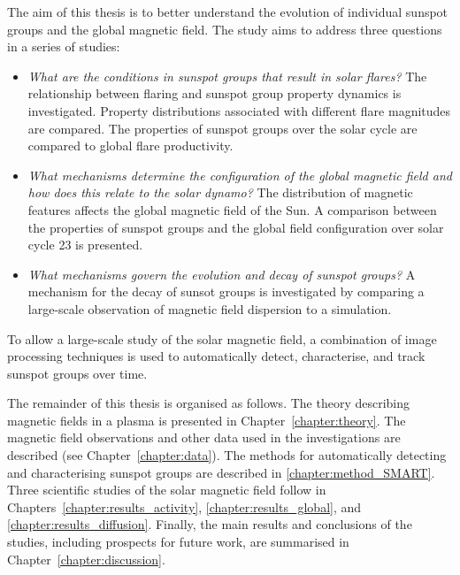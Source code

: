 The aim of this thesis is to better understand the evolution of individual sunspot groups and the global magnetic field. The study aims to address three questions in a series of studies:
\begin{itemize}
\item \emph{What are the conditions in sunspot groups that result in solar flares?} The relationship between flaring and sunspot group property dynamics is investigated. Property distributions associated with different flare magnitudes are compared. The properties of sunspot groups over the solar cycle are compared to global flare productivity. 
\item \emph{What mechanisms determine the configuration of the global magnetic field and how does this relate to the solar dynamo?} The distribution of magnetic features affects the global magnetic field of the Sun. A comparison between the properties of sunspot groups and the global field configuration over solar cycle 23 is presented. 
\item \emph{What mechanisms govern the evolution and decay of sunspot groups?} A mechanism for the decay of sunsot groups is investigated by comparing a large-scale observation of magnetic field dispersion to a simulation. 
\end{itemize}
To allow a large-scale study of the solar magnetic field, a combination of image processing techniques is used to automatically detect, characterise, and track sunspot groups over time.

The remainder of this thesis is organised as follows.
The theory describing magnetic fields in a plasma is presented in Chapter~\ref{chapter:theory}. 
The magnetic field observations and other data used in the investigations are described (see Chapter~\ref{chapter:data}). 
The methods for automatically detecting and characterising sunspot groups are described in \ref{chapter:method_SMART}. 
Three scientific studies of the solar magnetic field follow in Chapters~\ref{chapter:results_activity}, \ref{chapter:results_global}, and \ref{chapter:results_diffusion}.
Finally, the main results and conclusions of the studies, including prospects for future work, are summarised in Chapter~\ref{chapter:discussion}.